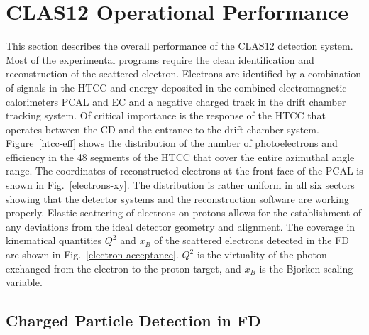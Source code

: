 \documentclass[final,3p,times,twocolumn,authoryear]{elsarticle}
\begin{document}
\section{CLAS12 Operational Performance}
This section describes the overall performance of the CLAS12 detection system. 
Most of the experimental programs require the clean identification and reconstruction of the scattered electron. 
Electrons are identified by a combination of signals in the HTCC and energy deposited in the combined 
electromagnetic calorimeters PCAL and EC and a negative charged track in the drift chamber tracking 
system. Of critical importance is the response of the HTCC that operates between the CD and the entrance to the drift chamber 
system. Figure~\ref{htcc-eff} shows the distribution of the number of photoelectrons and efficiency in the 48 segments of the HTCC that cover the entire azimuthal angle range. 
The coordinates of reconstructed electrons at the front face of the PCAL is shown in Fig.~\ref{electrons-xy}. 
The distribution is rather uniform in all six sectors showing that the detector systems and the reconstruction software are working properly.
 Elastic scattering  of electrons on protons allows for the establishment of any deviations from the ideal detector 
geometry and alignment. The coverage in kinematical quantities $Q^2$ and $x_B$ of the scattered electrons detected in the FD are shown in Fig.~\ref{electron-acceptance}. $Q^2$ is the virtuality of the 
photon exchanged from the electron to the proton target, and $x_B$ is the Bjorken scaling variable.

 \subsection{\rm Charged Particle Detection in FD}
 
\end{document}
